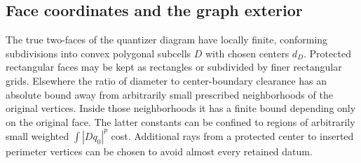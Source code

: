 \subsection{Face coordinates and the graph exterior}

\begin{lemma}\label{qt:subdivision}
The true two-faces of the quantizer diagram have locally finite,
conforming subdivisions into convex polygonal subcells $D$ with
chosen centers $d_D$.  Protected rectangular faces may be kept as
rectangles or subdivided by finer rectangular grids.  Elsewhere the
ratio of diameter to center-boundary clearance has an absolute bound
away from arbitrarily small prescribed neighborhoods of the original
vertices.  Inside those neighborhoods it has a finite bound depending
only on the original face.  The latter constants can be confined to
regions of arbitrarily small weighted $\int|Dq_0|^p$ cost.  Additional
rays from a protected center to inserted perimeter vertices can be
chosen to avoid almost every retained datum.
\end{lemma}

